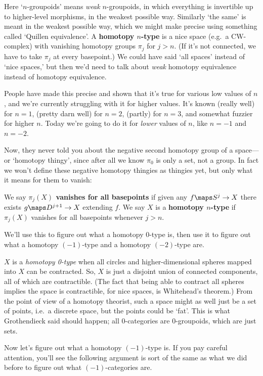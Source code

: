 \documentclass{amsart}
\begin{document}
Here `$n$-groupoids' means \emph{weak} $n$-groupoids, in which
everything is invertible up to higher-level morphisms, in the
weakest possible way.  Similarly `the same' is meant in the weakest
possible way, which we might make precise using something
called `Quillen equivalence'.  A {\bf homotopy $n$-type} is
a nice space (e.g.\ a CW-complex) with vanishing homotopy groups
$\pi_j$ for $j>n$.  (If it's not connected, we have to take $\pi_j$ at
every basepoint.)  We could have said `all spaces' instead of `nice
spaces,' but then we'd need to talk about \emph{weak} homotopy
equivalence instead of homotopy equivalence.

People have made this precise and shown that it's true for various low
values of $n$, and we're currently struggling with it for higher
values.  It's known (really well) for $n=1$, (pretty darn well) for
$n=2$, (partly) for $n=3$, and somewhat fuzzier for higher $n$.  Today
we're going to do it for \emph{lower} values of $n$, like $n = -1$
and $n= -2$.  

Now, they never told you about the negative second homotopy group of
a space---or `homotopy thingy', since after all we know $\pi_0$ is 
only a set, not a group.   In fact we won't define these negative 
homotopy thingies as thingies yet, but only what it means for them to vanish:

\begin{defn}
  We say {\bf $\pi_j(X)$ vanishes for all basepoints} if given any
  $f\maps S^j\to X$ there exists $g\maps D^{j+1}\to X$ extending $f$.
  We say $X$ is a {\bf homotopy $n$-type} if $\pi_j(X)$ vanishes
  for all basepoints whenever $j > n$.
\end{defn}

We'll use this to figure out what a homotopy 0-type is, then use it
to figure out what a homotopy $(-1)$-type and a homotopy $(-2)$-type
are.  

$X$ is a \emph{homotopy 0-type} when all circles and higher-dimensional
spheres mapped into $X$ can be contracted.  So, $X$ is just a disjoint
union of connected components, all of which are contractible.  (The
fact that being able to contract all spheres implies the space is
contractible, for nice spaces, is Whitehead's theorem.)  From the
point of view of a homotopy theorist, such a space might as well just
be a set of points, i.e.\ a discrete space, but the points could be
`fat'.  This is what Grothendieck said should happen; all
0-categories are 0-groupoids, which are just sets.

Now let's figure out what a homotopy $(-1)$-type is.
If you pay careful attention, you'll see the following argument 
is sort of the same as what we did
before to figure out what $(-1)$-categories are.
\end{document}
